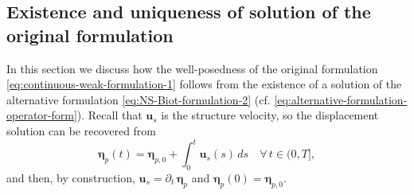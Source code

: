 \documentclass[11pt]{article}
\numberwithin{equation}{section}
\newcommand{\bbeta}{{\boldsymbol\eta}}
\newcommand{\bu}{\mathbf{u}}
\newcommand{\0}{{\mathbf{0}}}
\def\bV{\mathbf{V}}
\def\L{\mathrm{L}}
\def\W{\mathrm{W}}
\numberwithin{equation}{section}
\begin{document}

\subsection{Existence and uniqueness of solution of the original formulation}

In this section we discuss how the well-posedness of the original formulation \eqref{eq:continuous-weak-formulation-1} follows from the existence of a solution of the alternative formulation \eqref{eq:NS-Biot-formulation-2} (cf. \eqref{eq:alternative-formulation-operator-form}).
Recall that $\bu_s$ is the structure velocity, so the displacement solution can be recovered from
\begin{equation}\label{eq:etap-us-relation}
\bbeta_p(t) = \bbeta_{p,0} + \int^t_0 \bu_s(s)\,ds \quad \forall\, t\in (0,T],
\end{equation}
and then, by construction, $\bu_s = \partial_t\,\bbeta_p$ and $\bbeta_p(0) = \bbeta_{p,0}$.
\end{document}
